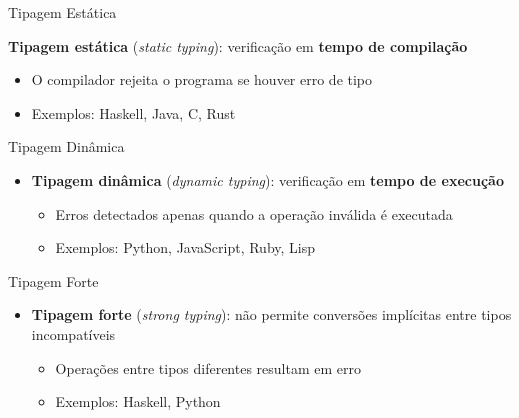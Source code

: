 \begin{frame}{Tipagem Estática}

    \textbf{Tipagem estática} (\emph{static typing}): verificação em
    \textbf{tempo de compilação}

    \begin{itemize}

        \item
        O compilador rejeita o programa se houver erro de tipo
        \item
        Exemplos: Haskell, Java, C, Rust
    \end{itemize}
\end{frame}

\begin{frame}{Tipagem Dinâmica}

    \begin{itemize}

        \item
        \textbf{Tipagem dinâmica} (\emph{dynamic typing}): verificação em
        \textbf{tempo de execução}

        \begin{itemize}

            \item
            Erros detectados apenas quando a operação inválida é executada
            \item
            Exemplos: Python, JavaScript, Ruby, Lisp
        \end{itemize}
    \end{itemize}
\end{frame}

\begin{frame}{Tipagem Forte}

    \begin{itemize}

        \item
        \textbf{Tipagem forte} (\emph{strong typing}): não permite conversões
        implícitas entre tipos incompatíveis

        \begin{itemize}

            \item
            Operações entre tipos diferentes resultam em erro
            \item
            Exemplos: Haskell, Python
        \end{itemize}
    \end{itemize}
\end{frame}

